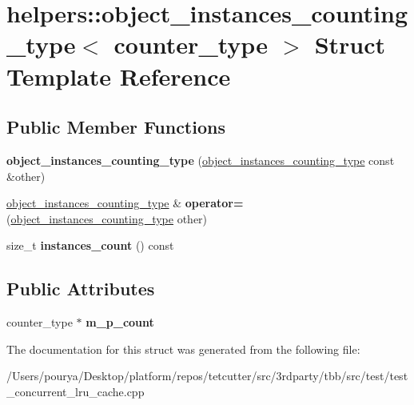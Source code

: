 \hypertarget{structhelpers_1_1object__instances__counting__type}{}\section{helpers\+:\+:object\+\_\+instances\+\_\+counting\+\_\+type$<$ counter\+\_\+type $>$ Struct Template Reference}
\label{structhelpers_1_1object__instances__counting__type}
\subsection*{Public Member Functions}
\begin{DoxyCompactItemize}
\item 
\hypertarget{structhelpers_1_1object__instances__counting__type_a4e59cf2b4f1a433194525fb5e4ade560}{}{\bfseries object\+\_\+instances\+\_\+counting\+\_\+type} (\hyperlink{structhelpers_1_1object__instances__counting__type}{object\+\_\+instances\+\_\+counting\+\_\+type} const \&other)\label{structhelpers_1_1object__instances__counting__type_a4e59cf2b4f1a433194525fb5e4ade560}

\item 
\hypertarget{structhelpers_1_1object__instances__counting__type_aec3645f650ce537634dca7c87fe3b385}{}\hyperlink{structhelpers_1_1object__instances__counting__type}{object\+\_\+instances\+\_\+counting\+\_\+type} \& {\bfseries operator=} (\hyperlink{structhelpers_1_1object__instances__counting__type}{object\+\_\+instances\+\_\+counting\+\_\+type} other)\label{structhelpers_1_1object__instances__counting__type_aec3645f650ce537634dca7c87fe3b385}

\item 
\hypertarget{structhelpers_1_1object__instances__counting__type_a0ada0ea47d09b9027f78f6a589560f77}{}size\+\_\+t {\bfseries instances\+\_\+count} () const \label{structhelpers_1_1object__instances__counting__type_a0ada0ea47d09b9027f78f6a589560f77}

\end{DoxyCompactItemize}
\subsection*{Public Attributes}
\begin{DoxyCompactItemize}
\item 
\hypertarget{structhelpers_1_1object__instances__counting__type_a2508ef96733c662668875238091d2c9e}{}counter\+\_\+type $\ast$ {\bfseries m\+\_\+p\+\_\+count}\label{structhelpers_1_1object__instances__counting__type_a2508ef96733c662668875238091d2c9e}

\end{DoxyCompactItemize}


The documentation for this struct was generated from the following file\+:\begin{DoxyCompactItemize}
\item 
/\+Users/pourya/\+Desktop/platform/repos/tetcutter/src/3rdparty/tbb/src/test/test\+\_\+concurrent\+\_\+lru\+\_\+cache.\+cpp\end{DoxyCompactItemize}
